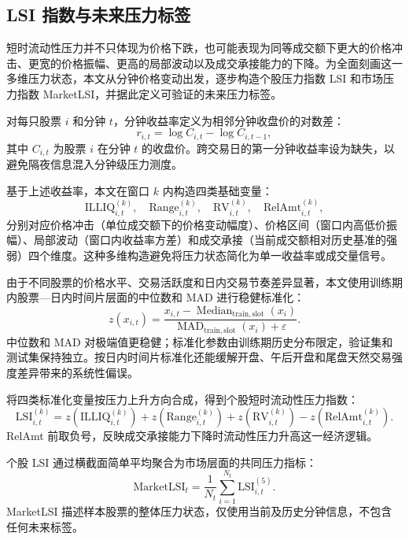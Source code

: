 \documentclass[12pt,a4paper]{ctexart}
\newcommand{\MarketLSI}{\mathrm{MarketLSI}}
\newcommand{\LSI}{\mathrm{LSI}}
\begin{document}
\subsection{LSI 指数与未来压力标签}
\label{subsec:lsi}

短时流动性压力并不只体现为价格下跌，也可能表现为同等成交额下更大的价格冲击、更宽的价格振幅、更高的局部波动以及成交承接能力的下降。为全面刻画这一多维压力状态，本文从分钟价格变动出发，逐步构造个股压力指数 LSI 和市场压力指数 MarketLSI，并据此定义可验证的未来压力标签。

对每只股票 $i$ 和分钟 $t$，分钟收益率定义为相邻分钟收盘价的对数差：
\begin{equation}
r_{i,t}=\log C_{i,t}-\log C_{i,t-1},
\end{equation}
其中 $C_{i,t}$ 为股票 $i$ 在分钟 $t$ 的收盘价。跨交易日的第一分钟收益率设为缺失，以避免隔夜信息混入分钟级压力测度。

基于上述收益率，本文在窗口 $k$ 内构造四类基础变量：
\begin{equation}
\mathrm{ILLIQ}^{(k)}_{i,t}, \quad \mathrm{Range}^{(k)}_{i,t}, \quad \mathrm{RV}^{(k)}_{i,t}, \quad \mathrm{RelAmt}^{(k)}_{i,t},
\end{equation}
分别对应价格冲击（单位成交额下的价格变动幅度）、价格区间（窗口内高低价振幅）、局部波动（窗口内收益率方差）和成交承接（当前成交额相对历史基准的强弱）四个维度。这种多维构造避免将压力状态简化为单一收益率或成交量信号。

由于不同股票的价格水平、交易活跃度和日内交易节奏差异显著，本文使用训练期内股票—日内时间片层面的中位数和 MAD 进行稳健标准化：
\begin{equation}
z(x_{i,t})=\frac{x_{i,t}-\operatorname{Median}_{\mathrm{train},\mathrm{slot}}(x_i)}
{\operatorname{MAD}_{\mathrm{train},\mathrm{slot}}(x_i)+\varepsilon}.
\end{equation}
中位数和 MAD 对极端值更稳健；标准化参数由训练期历史分布限定，验证集和测试集保持独立。按日内时间片标准化还能缓解开盘、午后开盘和尾盘天然交易强度差异带来的系统性偏误。

将四类标准化变量按压力上升方向合成，得到个股短时流动性压力指数：
\begin{equation}
\LSI^{(k)}_{i,t}
=z(\mathrm{ILLIQ}^{(k)}_{i,t})
+z(\mathrm{Range}^{(k)}_{i,t})
+z(\mathrm{RV}^{(k)}_{i,t})
-z(\mathrm{RelAmt}^{(k)}_{i,t}).
\end{equation}
RelAmt 前取负号，反映成交承接能力下降时流动性压力升高这一经济逻辑。

个股 LSI 通过横截面简单平均聚合为市场层面的共同压力指标：
\begin{equation}
\MarketLSI_t=\frac{1}{N_t}\sum_{i=1}^{N_t} \LSI^{(5)}_{i,t}.
\end{equation}
MarketLSI 描述样本股票的整体压力状态，仅使用当前及历史分钟信息，不包含任何未来标签。
\end{document}
